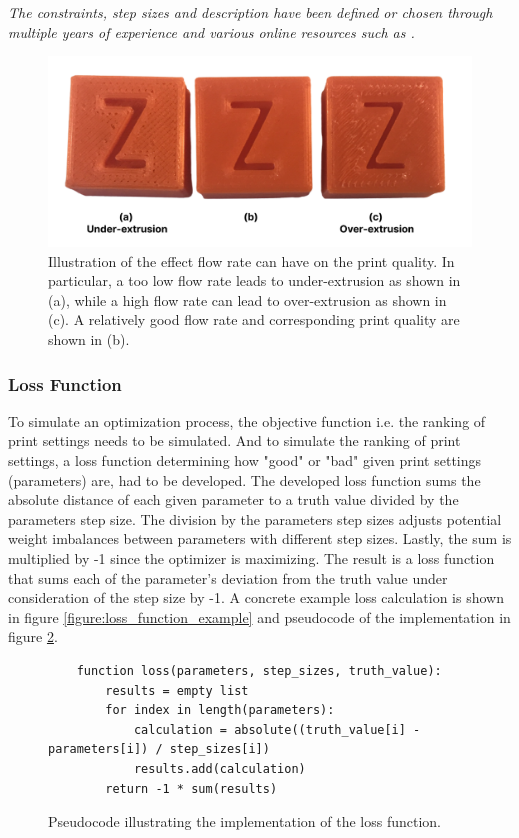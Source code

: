 \textit{The constraints, step sizes and description have been defined or chosen through multiple years of experience and various online resources such as \cite{printTemperatureSetting, flowRateSetting}.} 

\begin{figure}[h]
    \centering
    \includegraphics[width=0.7\linewidth]{assets/extrusion_example.png}
    \caption{Illustration of the effect flow rate can have on the print quality. In particular, a too low flow rate leads to under-extrusion as shown in (a), while a high flow rate can lead to over-extrusion as shown in (c). A relatively good flow rate and corresponding print quality are shown in (b).}
    \label{figure/extrusion_example}
\end{figure}

\subsubsection{Loss Function}

To simulate an optimization process, the objective function i.e. the ranking of print settings needs to be simulated. And to simulate the ranking of print settings, a loss function determining how "good" or "bad" given print settings (parameters) are, had to be developed. The developed loss function sums the absolute distance of each given parameter to a truth value divided by the parameters step size. The division by the parameters step sizes adjusts potential weight imbalances between parameters with different step sizes. Lastly, the sum is multiplied by -1 since the optimizer is maximizing. The result is a loss function that sums each of the parameter's deviation from the truth value under consideration of the step size by -1. A concrete example loss calculation is shown in figure \ref{figure:loss_function_example} and pseudocode of the implementation in figure \ref{figure/loss_function_pseudocode}. 
\begin{figure}[h]
    \centering
    \begin{verbatim}
    function loss(parameters, step_sizes, truth_value):
        results = empty list
        for index in length(parameters):
            calculation = absolute((truth_value[i] - parameters[i]) / step_sizes[i])
            results.add(calculation)
        return -1 * sum(results)
    \end{verbatim}
    \caption{Pseudocode illustrating the implementation of the loss function.}
    \label{figure/loss_function_pseudocode}
\end{figure}

